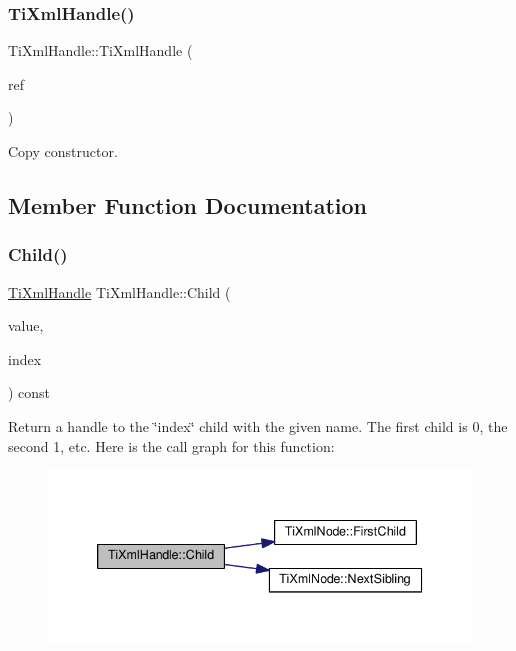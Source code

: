 \subsubsection{\texorpdfstring{Ti\+Xml\+Handle()}{TiXmlHandle()}\hspace{0.1cm}{\footnotesize\ttfamily [2/2]}}
{\footnotesize\ttfamily Ti\+Xml\+Handle\+::\+Ti\+Xml\+Handle (\begin{DoxyParamCaption}\item[{const \hyperlink{class_ti_xml_handle}{Ti\+Xml\+Handle} \&}]{ref }\end{DoxyParamCaption})\hspace{0.3cm}{\ttfamily [inline]}}



Copy constructor. 



\subsection{Member Function Documentation}
\mbox{\label{class_ti_xml_handle_a9903b035444ee36450fe00ede403f920}} 
\subsubsection{\texorpdfstring{Child()}{Child()}\hspace{0.1cm}{\footnotesize\ttfamily [1/2]}}
{\footnotesize\ttfamily \hyperlink{class_ti_xml_handle}{Ti\+Xml\+Handle} Ti\+Xml\+Handle\+::\+Child (\begin{DoxyParamCaption}\item[{const char $\ast$}]{value,  }\item[{int}]{index }\end{DoxyParamCaption}) const}

Return a handle to the \char`\"{}index\char`\"{} child with the given name. The first child is 0, the second 1, etc. Here is the call graph for this function\+:\nopagebreak
\begin{figure}[H]
\begin{center}
\leavevmode
\includegraphics[width=339pt]{class_ti_xml_handle_a9903b035444ee36450fe00ede403f920_cgraph}
\end{center}
\end{figure}
\mbox{\label{class_ti_xml_handle_a32585942abb28e03eea9c5223f38a659}} 
